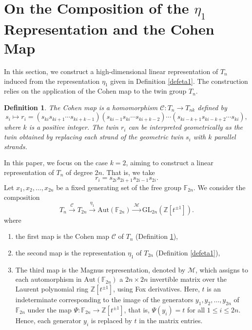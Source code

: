 \documentclass[reqno]{amsart}
\newtheorem{definition}[theorem]{Definition}
\begin{document}
\section{On the Composition of the $\eta_1$ Representation and the Cohen Map}
 
In this section, we construct a high-dimensional linear representation of $T_n$ induced from the representation $\eta_1$ given in Definition \ref{defeta1}. The construction relies on the application of the Cohen map to the twin group $T_n$.

\begin{definition} \cite{Cohen1996} \label{defcoh}
The Cohen map is a homomorphism $\mathcal{C}: T_n \longrightarrow T_{nk}$ defined by
\vskip -12pt
\[
s_i \longmapsto r_i
=
(s_{ki}s_{ki+1}\cdots s_{ki+k-1})
(s_{ki-1}s_{ki}\cdots s_{ki+k-2})\cdots
(s_{ki-k+1}s_{ki-k+2}\cdots s_{ki}),
\]
where $k$ is a positive integer. The twin $r_i$ can be interpreted geometrically as the twin obtained by replacing each strand of the geometric twin $s_i$ with $k$ parallel strands. 
\end{definition}


In this paper, we focus on the case $k=2$, aiming to construct a linear representation of $T_n$ of degree $2n$. That is, we take $$r_i=s_{2i}s_{2i+1}s_{2i-1}s_{2i}.$$ Let $x_1, x_2, \dots, x_{2n}$ be a fixed generating set of the free group $\mathbb{F}_{2n}$. We consider the composition
\[
T_n \xrightarrow{\ \mathcal{C}\ } T_{2n}
\xrightarrow{\ \eta_1 \ } \mathrm{Aut}(\mathbb{F}_{2n})
\xrightarrow{\ \mathcal{M}\ } \mathrm{GL}_{2n}(\mathbb{Z}[t^{\pm1}]).
\]
where
\begin{enumerate}
    \item the first map is the Cohen map $\mathcal{C}$ of $T_n$ (Definition \ref{defcoh}),
    \item the second map is the representation $\eta_1$ of $T_{2n}$ (Definition \ref{defeta1}),
\item The third map is the Magnus representation, denoted by $\mathcal{M}$, which assigns to each automorphism in $\mathrm{Aut}(\mathbb{F}_{2n})$ a $2n \times 2n$ invertible matrix over the Laurent polynomial ring $\mathbb{Z}[t^{\pm1}]$, using Fox derivatives. Here, $t$ is an indeterminate corresponding to the image of the generators $y_1, y_2, \ldots, y_{2n}$ of $\mathbb{F}_{2n}$ under the map $\Psi:\mathbb{F}_{2n} \longrightarrow \mathbb{Z}[t^{\pm1}]$, that is, $\Psi(y_i) = t$ for all $1 \le i \le 2n$. Hence, each generator $y_i$ is replaced by $t$ in the matrix entries.
\end{enumerate}
\end{document}
